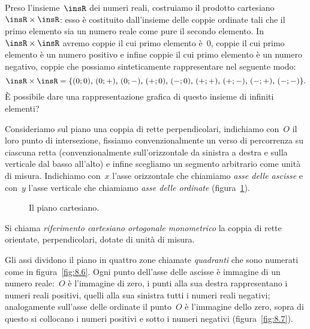 Preso l'insieme~$\insR$ dei numeri reali, costruiamo il prodotto cartesiano~$\insR\times \insR$: esso è costituito dall'insieme delle coppie
ordinate tali che il primo elemento sia un numero reale come pure il secondo elemento. In~$\insR\times \insR$ avremo coppie il cui primo
elemento è~$0$, coppie il cui primo elemento è un numero positivo e infine coppie il cui primo elemento è un numero negativo,
coppie che possiamo sinteticamente rappresentare nel seguente modo:
\begin{equation*}
\insR\times \insR=\{(0;0)\text{, }(0;+)\text{, }(0;-)\text{, }(+;0)\text{, }(-;0)\text{, }(+;+)\text{, }(+;-)\text{, }(-;+)\text{, }(-;-)\}.
\end{equation*}
\`E possibile dare una rappresentazione grafica di questo insieme di infiniti elementi?

Consideriamo sul piano una coppia di rette perpendicolari, indichiamo con~$O$ il loro punto di intersezione,
fissiamo convenzionalmente un verso di percorrenza su ciascuna retta (convenzionalmente sull'orizzontale da
sinistra a destra e sulla verticale dal basso all'alto) e infine scegliamo un segmento arbitrario come unità di misura.
Indichiamo con~$x$ l'asse orizzontale che chiamiamo \emph{asse delle ascisse} e con~$y$ l'asse verticale che chiamiamo \emph{asse delle ordinate} (figura~\ref{fig:8.5}).

\begin{figure}[htb]
 \begin{minipage}[t]{.45\textwidth}
 \centering
 \caption{}\label{fig:8.4}
 \end{minipage}\hfil
 \begin{minipage}[t]{.45\textwidth}
 \centering
 \caption{Il piano cartesiano.}\label{fig:8.5}
 \end{minipage}
\end{figure}

\begin{definizione}
Si chiama \emph{riferimento cartesiano ortogonale monometrico} la coppia di rette orientate, perpendicolari, dotate di unità di misura.
\end{definizione}

Gli assi dividono il piano in quattro zone chiamate \emph{quadranti} che sono numerati come in figura~\ref{fig:8.6}.
Ogni punto dell'asse delle ascisse è immagine di un numero reale:~$O$ è l'immagine di zero,
i punti alla sua destra rappresentano i numeri reali positivi, quelli alla sua sinistra tutti i numeri
reali negativi; analogamente sull'asse delle ordinate il punto~$O$ è l'immagine dello zero, sopra di questo si collocano i numeri
positivi e sotto i numeri negativi (figura~\ref{fig:8.7}).


